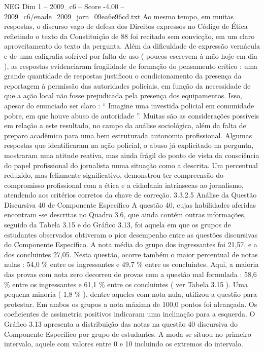 \begin{textsample}{NEG Dim 1 – 2009\_c6 – Score -4.00 – 2009\_c6/enade\_2009\_jorn\_09ea6e96cd.txt}
Ao mesmo tempo, em muitas respostas, o discurso vago de defesa dos Direitos expressos no Código de Ética refletindo o texto da Constituição de 88 foi recitado sem convicção, em um claro aproveitamento do texto da pergunta.
Além da dificuldade de expressão vernácula e de uma caligrafia sofrível por falta de uso ( poucos escrevem à mão hoje em dia ), as respostas evidenciaram fragilidade de formação do pensamento crítico : uma grande quantidade de respostas justificou o condicionamento da presença da reportagem à permissão das autoridades policiais, em função da necessidade de que a ação local não fosse prejudicada pela presença dos equipamentos.
Isso, apesar do enunciado ser claro : “ Imagine uma investida policial em comunidade pobre, em que houve abuso de autoridade ”.
Muitas são as considerações possíveis em relação a este resultado, no campo da análise sociológica, além da falta de preparo acadêmico para uma bem estruturada autonomia profissional.
Algumas respostas que identificaram na ação policial, o abuso já explicitado na pergunta, mostraram uma atitude reativa, mas ainda frágil do ponto de vista da consciência do papel profissional do jornalista numa situação como a descrita.
Um percentual reduzido, mas felizmente significativo, demonstrou ter compreensão do compromisso profissional com a ética e a cidadania intrínsecas ao jornalismo, atendendo aos critérios corretos da chave de correção. 3.3.2.5 Análise da Questão Discursiva 40 de Componente Específico A questão 40, cujas habilidades aferidas encontram -se descritas no Quadro 3.6, que ainda contém outras informações, seguido da Tabela 3.15 e do Gráfico 3.13, foi aquela em que os grupos de estudantes observados obtiveram o pior desempenho entre as questões discursivas do Componente Específico.
A nota média do grupo dos ingressantes foi 21,57, e a dos concluintes 27,05.
Nesta questão, ocorre também o maior percentual de notas nulas : 54,0 \% entre os ingressantes e 49,7 \% entre os concluintes.
Aqui, a maioria das provas com nota zero decorreu de provas com a questão mal formulada : 58,6 \% entre os ingressantes e 61,1 \% entre os concluintes ( ver Tabela 3.15 ).
Uma pequena minoria ( 1,8 \% ), dentre aqueles com nota nula, utilizou a questão para protestar.
Em ambos os grupos a nota máxima de 100,0 pontos foi alcançada.
Os coeficientes de assimetria positivos indicaram uma inclinação para a esquerda.
O Gráfico 3.13 apresenta a distribuição das notas na questão 40 discursiva do Componente Específico por grupo de estudantes.
A moda se situou no primeiro intervalo, aquele com valores entre 0 e 10 incluindo os extremos do intervalo.

\end{textsample}
